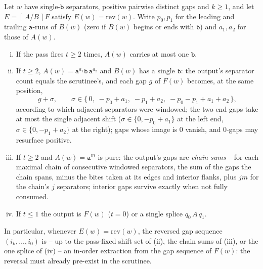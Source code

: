 \documentclass[runningheads,envcountsect]{llncs}
\begin{document}
\begin{lemma}
    \label{dich:lem:FP}
    Let $w$ have single-$\mathtt b$ separators, positive pairwise distinct gaps and $k \ge 1$, and let $E = [\,A/B\,]F$ satisfy $E(w) = \mathrm{rev}(w)$. Write $p_0, p_1$ for the leading and trailing $\mathtt a$-runs of $B(w)$ (zero if $B(w)$ begins or ends with $\mathtt b$) and $a_1, a_2$ for those of $A(w)$.
    \begin{enumerate}[(i)]
        \item If the pass fires $t \ge 2$ times, $A(w)$ carries at most one $\mathtt b$.
        \item If $t \ge 2$, $A(w) = \mathtt a^{a_1}\mathtt b\,\mathtt a^{a_2}$ and $B(w)$ has a single $\mathtt b$: the output's separator count equals the scrutinee's, and each gap $g$ of $F(w)$ becomes, at the same position,
        \begin{equation*}
            g + \sigma, \qquad
            \sigma \in \{\,0,\; -p_0 + a_1,\; -p_1 + a_2,\; -p_0 - p_1 + a_1 + a_2\,\},
        \end{equation*}
        according to which adjacent separators were windowed; the two end gaps take at most the single adjacent shift ($\sigma \in \{0, -p_0 + a_1\}$ at the left end, $\sigma \in \{0, -p_1 + a_2\}$ at the right); gaps whose image is $0$ vanish, and $0$-gaps may resurface positive.
        \item If $t \ge 2$ and $A(w) = \mathtt a^{m}$ is pure: the output's gaps are \emph{chain sums} -- for each maximal chain of consecutive windowed separators, the sum of the gaps the chain spans, minus the bites taken at its edges and interior flanks, plus $jm$ for the chain's $j$ separators; interior gaps survive exactly when not fully consumed.
        \item If $t \le 1$ the output is $F(w)$ ($t = 0$) or a single splice $q_0\,A\,q_1$.
    \end{enumerate}
    In particular, whenever $E(w) = \mathrm{rev}(w)$, the reversed gap sequence $(i_k, \ldots, i_0)$ is -- up to the pass-fixed shift set of (ii), the chain sums of (iii), or the one splice of (iv) -- an in-order extraction from the gap sequence of $F(w)$: the reversal must already pre-exist in the scrutinee.
\end{lemma}
\end{document}
